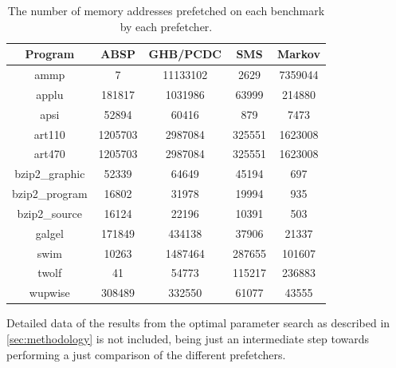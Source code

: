 \begin{table}[htbp]
  \centering
  \begin{tabular}{|c|c|c|c|c|}
    \hline
    \textbf{Program} & \textbf{ABSP} & \textbf{GHB/PCDC} & \textbf{SMS} & \textbf{Markov} \\ \hline
    ammp             & 7             & 11133102          & 2629         & 7359044 \\ \hline
    applu            & 181817        & 1031986           & 63999        & 214880 \\ \hline
    apsi             & 52894         & 60416             & 879          & 7473 \\ \hline
    art110           & 1205703       & 2987084           & 325551       & 1623008 \\ \hline
    art470           & 1205703       & 2987084           & 325551       & 1623008 \\ \hline
    bzip2\_graphic   & 52339         & 64649             & 45194        & 697 \\ \hline
    bzip2\_program   & 16802         & 31978             & 19994        & 935 \\ \hline
    bzip2\_source    & 16124         & 22196             & 10391        & 503 \\ \hline
    galgel           & 171849        & 434138            & 37906        & 21337 \\ \hline
    swim             & 10263         & 1487464           & 287655       & 101607 \\ \hline
    twolf            & 41            & 54773             & 115217       & 236883 \\ \hline
    wupwise          & 308489        & 332550            & 61077        & 43555 \\ \hline
  \end{tabular}
  \caption{The number of memory addresses prefetched on each benchmark by each prefetcher.}
  \label{tab:numPrefetches}
\end{table}


Detailed data of the results from the optimal parameter search as
described in \autoref{sec:methodology} is not included, being just an
intermediate step towards performing a just comparison of the
different prefetchers.

